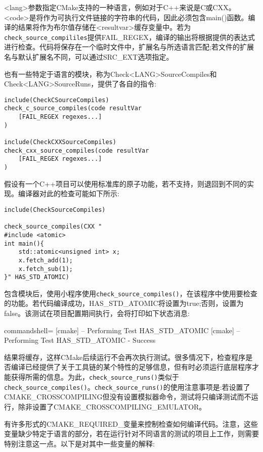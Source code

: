 <lang>参数指定CMake支持的一种语言，例如对于C++来说是C或CXX。<code>是将作为可执行文件链接的字符串的代码，因此必须包含main()函数。编译的结果将作为布尔值存储在<resultvar>缓存变量中。若为\texttt{check\_source\_compililes}提供FAIL\_REGEX，编译的输出将根据提供的表达式进行检查。代码将保存在一个临时文件中，扩展名与所选语言匹配;若文件的扩展名与默认扩展名不同，可以通过SRC\_EXT选项指定。

也有一些特定于语言的模块，称为Check<LANG>SourceCompiles和Check<LANG>SourceRuns，提供了各自的指令:

\begin{lstlisting}[style=styleCMake]
include(CheckCSourceCompiles)
check_c_source_compiles(code resultVar
	[FAIL_REGEX regexes...]
)

include(CheckCXXSourceCompiles)
check_cxx_source_compiles(code resultVar
	[FAIL_REGEX regexes...]
)
\end{lstlisting}

假设有一个C++项目可以使用标准库的原子功能，若不支持，则退回到不同的实现。编译器对此的检查可能如下所示:

\begin{lstlisting}[style=styleCMake]
include(CheckSourceCompiles)

check_source_compiles(CXX "
#include <atomic>
int main(){
	std::atomic<unsigned int> x;
	x.fetch_add(1);
	x.fetch_sub(1);
}" HAS_STD_ATOMIC)
\end{lstlisting}

包含模块后，使用小程序使用\texttt{check\_source\_compiles()}，在该程序中使用要检查的功能。若代码编译成功，HAS\_STD\_ATOMIC将设置为true;否则，设置为false。该测试在项目配置期间执行，会将打印如下状态消息:

\begin{tcblisting}{commandshell={}}
[cmake] -- Performing Test HAS_STD_ATOMIC
[cmake] -- Performing Test HAS_STD_ATOMIC - Success
\end{tcblisting}

结果将缓存，这样CMake后续运行不会再次执行测试。很多情况下，检查程序是否编译已经提供了关于工具链的某个特性的足够信息，但有时必须运行底层程序才能获得所需的信息。为此，\texttt{check\_source\_runs()}类似于\texttt{check\_source\_compiles()}。\texttt{check\_source\_runs()}的使用注意事项是:若设置了CMAKE\_CROSSCOMPILING但没有设置模拟器命令，测试将只编译测试而不运行，除非设置了CMAKE\_CROSSCOMPILING\_EMULATOR。

有许多形式的CMAKE\_REQUIRED\_变量来控制检查如何编译代码。注意，这些变量缺少特定于语言的部分，若在运行针对不同语言的测试的项目上工作，则需要特别注意这一点。以下是对其中一些变量的解释:

